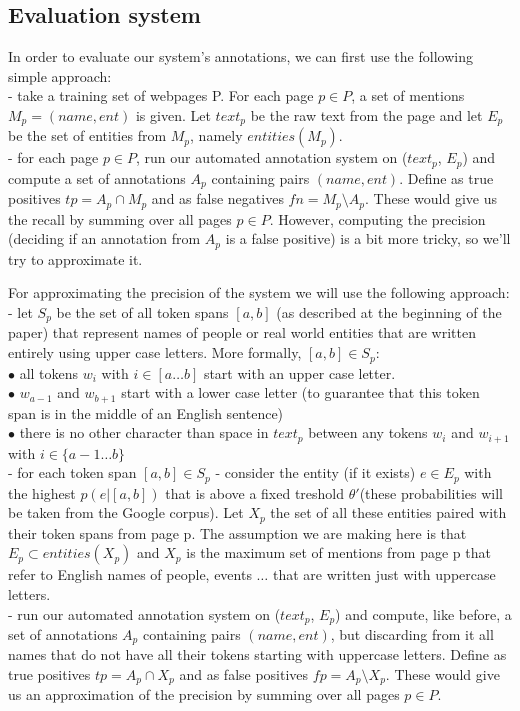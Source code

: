 \documentclass{article}
\begin{document}
\newpage
{\color{blue}
\subsection*{Evaluation system}
In order to evaluate our system's annotations, we can first use the following simple approach:\\
- take a training set of webpages P. For each page $p\in P$, a set of mentions $M_p = (name,ent)$ is given. Let $text_p$ be the raw text from the page and let $E_p$ be the set of entities from $M_p$, namely $entities(M_p)$. \\
- for each page $p\in P$, run our automated annotation system on ($text_p$, $E_p$) and compute a set of annotations $A_p$ containing pairs $(name,ent)$. Define as true positives $tp=A_p \cap M_p$ and as false negatives $fn=M_p \setminus A_p$. These would give us the recall by summing over all pages $p\in P$. However, computing the precision (deciding if an annotation from $A_p$ is a false positive) is a bit more tricky, so we'll try to approximate it. \\

\par For approximating the precision of the system we will use the following approach: \\
- let $S_p$ be the set of all token spans $[a,b]$ (as described at the beginning of the paper) that represent names of people or real world entities that are written entirely using upper case letters. More formally, $[a,b]\in S_p$: \\
$\bullet$ all tokens $w_i$ with $i\in [a\ldots b]$ start with an upper case letter. \\
$\bullet$ $w_{a-1}$ and $w_{b+1}$ start with a lower case letter (to guarantee that this token span is in the middle of an English sentence)\\
$\bullet$ there is no other character than space in $text_p$ between any tokens $w_i$ and $w_{i+1}$ with $i\in \{a-1 \ldots b\}$\\
- for each token span $[a,b] \in S_p$ - consider the entity (if it exists) $e\in E_p$ with the highest $p(e | [a,b])$ that is above a fixed treshold $\theta'$(these probabilities will be taken from the Google corpus). Let $X_p$ the set of all these entities paired with their token spans from page p. The assumption we are making here is that $E_p \subset entities(X_p)$ and $X_p$ is the maximum set of mentions from page p that refer to English names of people, events $\ldots$ that are written just with uppercase letters.\\
- run our automated annotation system on ($text_p$, $E_p$) and compute, like before, a set of annotations $A_p$ containing pairs  $(name,ent)$, but discarding from it all names that do not have all their tokens starting with uppercase letters. Define as true positives $tp=A_p \cap X_p$ and as false positives $fp=A_p \setminus X_p$. These would give us an approximation of the precision by summing over all pages $p\in P$. 
}
 
\end{document}
